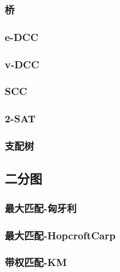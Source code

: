 \documentclass[twocolumn,a4]{article}
\newcommand{\addcpp}[1]{}
\begin{document}
		\subsubsection{桥}
			\addcpp{graph/bridge}
		\subsubsection{e-DCC}
		\subsubsection{v-DCC}
		\subsubsection{SCC}
			\addcpp{graph/SCC}
		\subsubsection{2-SAT}
			\addcpp{graph/2-SAT}
		\subsubsection{支配树}
	\subsection{二分图}
		\subsubsection{最大匹配-匈牙利}		
			\addcpp{graph/hungary}
		\subsubsection{最大匹配-HopcroftCarp}
			\addcpp{graph/HopcroftCarp}
		\subsubsection{带权匹配-KM} %
			\addcpp{graph/KM}
\end{document}
